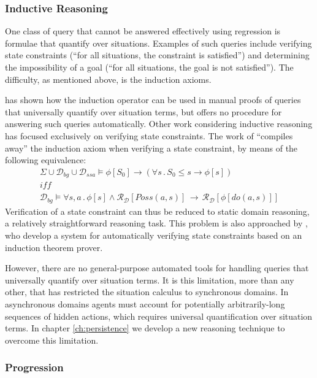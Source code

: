 \subsubsection{Inductive Reasoning}

One class of query that cannot be answered effectively using regression
is formulae that quantify over situations. Examples of such queries
include verifying state constraints ({}``for all situations, the
constraint is satisfied'') and determining the impossibility of a
goal ({}``for all situations, the goal is not satisfied''). The
difficulty, as mentioned above, is the induction axioms.

\citet{Reiter93proving} has shown how the induction operator can
be used in manual proofs of queries that universally quantify over
situation terms, but offers no procedure for answering such queries
automatically. Other work considering inductive reasoning has focused
exclusively on verifying state constraints. The work of \citet{Lin94-StateConstraints}
{}``compiles away'' the induction axiom when verifying a state constraint,
by means of the following equivalence:\begin{gather*}
\Sigma\cup\mathcal{D}_{bg}\cup\mathcal{D}_{ssa}\models\phi[S_{0}]\rightarrow\left(\forall s\,.\, S_{0}\leq s\rightarrow\phi[s]\right)\\
\mathit{iff}\\
\mathcal{D}_{bg}\models\forall s,a\,.\,\phi[s]\wedge\mathcal{R}_{\mathcal{D}}[Poss(a,s)]\,\rightarrow\,\mathcal{R}_{\mathcal{D}}[\phi[do(a,s)]]\end{gather*}
 Verification of a state constraint can thus be reduced to static
domain reasoning, a relatively straightforward reasoning task. This
problem is also approached by \citep{bertossi96automating}, who develop
a system for automatically verifying state constraints based on an
induction theorem prover.

However, there are no general-purpose automated tools for handling
queries that universally quantify over situation terms. It is this
limitation, more than any other, that has restricted the situation
calculus to synchronous domains. In asynchronous domains agents must
account for potentially arbitrarily-long sequences of hidden actions,
which requires universal quantification over situation terms. In chapter
\ref{ch:persistence} we develop a new reasoning technique to overcome
this limitation.


\subsubsection{Progression}

